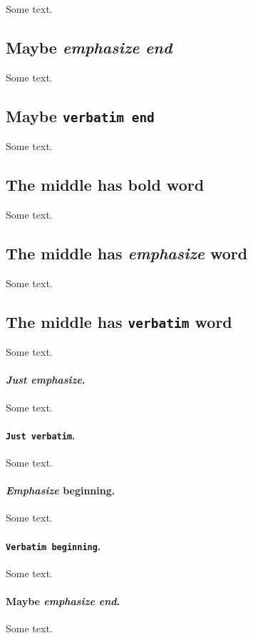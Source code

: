 \n\documentclass[%
oneside,                 %
final,                   %
10pt]{article}
\theoremstyle{definition}
\begin{document}
\begin{enumerate}
Some text.

\subsection{Maybe \emph{emphasize end}}

Some text.

\subsection{Maybe \texttt{verbatim end} }

Some text.

\subsection{The middle has \textbf{bold} word}

Some text.

\subsection{The middle has \emph{emphasize} word}

Some text.

\subsection{The middle has \texttt{verbatim} word}

Some text.

\paragraph{\emph{Just emphasize}.}
Some text.

\paragraph{\texttt{Just verbatim}.}
Some text.

\paragraph{\emph{Emphasize} beginning.}
Some text.

\paragraph{\texttt{Verbatim beginning}.}
Some text.

\paragraph{Maybe \emph{emphasize end}.}
Some text.


\end{enumerate}
\end{document}
